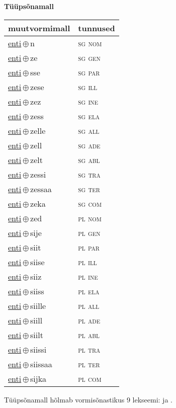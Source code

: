 

\vspace{3.5em}
\noindent \begin{minipage}{\textwidth}
\noindent \textbf{Tüüpsõnamall \,}\\

\begin{sideways}
\begin{tabular}{l l}
muutvormimall & tunnused \\
\hline
\underline{enti}\,$\oplus$\,n & \textsc{ sg nom } \\
\underline{enti}\,$\oplus$\,ze & \textsc{ sg gen } \\
\underline{enti}\,$\oplus$\,sse & \textsc{ sg par } \\
\underline{enti}\,$\oplus$\,zese & \textsc{ sg ill } \\
\underline{enti}\,$\oplus$\,zez & \textsc{ sg ine } \\
\underline{enti}\,$\oplus$\,zess & \textsc{ sg ela } \\
\underline{enti}\,$\oplus$\,zelle & \textsc{ sg all } \\
\underline{enti}\,$\oplus$\,zell & \textsc{ sg ade } \\
\underline{enti}\,$\oplus$\,zelt & \textsc{ sg abl } \\
\underline{enti}\,$\oplus$\,zessi & \textsc{ sg tra } \\
\underline{enti}\,$\oplus$\,zessaa & \textsc{ sg ter } \\
\underline{enti}\,$\oplus$\,zeka & \textsc{ sg com } \\
\underline{enti}\,$\oplus$\,zed & \textsc{ pl nom } \\
\underline{enti}\,$\oplus$\,sije & \textsc{ pl gen } \\
\underline{enti}\,$\oplus$\,siit & \textsc{ pl par } \\
\underline{enti}\,$\oplus$\,siise & \textsc{ pl ill } \\
\underline{enti}\,$\oplus$\,siiz & \textsc{ pl ine } \\
\underline{enti}\,$\oplus$\,siiss & \textsc{ pl ela } \\
\underline{enti}\,$\oplus$\,siille & \textsc{ pl all } \\
\underline{enti}\,$\oplus$\,siill & \textsc{ pl ade } \\
\underline{enti}\,$\oplus$\,siilt & \textsc{ pl abl } \\
\underline{enti}\,$\oplus$\,siissi & \textsc{ pl tra } \\
\underline{enti}\,$\oplus$\,siissaa & \textsc{ pl ter } \\
\underline{enti}\,$\oplus$\,sijka & \textsc{ pl com } \\
\end{tabular}
\end{sideways}
\label{tab:tüüpsõnamall-entin}

\end{minipage}

 
\vspace{1em}
\noindent Tüüpsõnamall  hõlmab vormisõnastikus 9 lekseemi:  ja .
